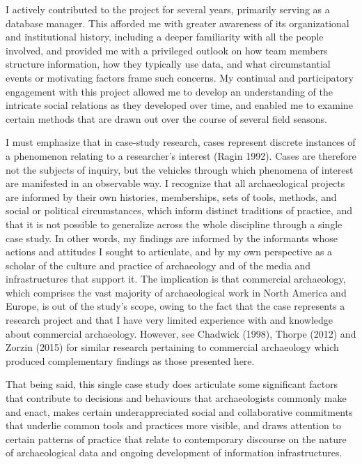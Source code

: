 \documentclass[
]{article}
\begin{document}
I actively contributed to the project for several years, primarily
serving as a database manager. This afforded me with greater awareness
of its organizational and institutional history, including a deeper
familiarity with all the people involved, and provided me with a
privileged outlook on how team members structure information, how they
typically use data, and what circumstantial events or motivating factors
frame such concerns. My continual and participatory engagement with this
project allowed me to develop an understanding of the intricate social
relations as they developed over time, and enabled me to examine certain
methods that are drawn out over the course of several field seasons.

I must emphasize that in case-study research, cases represent discrete
instances of a phenomenon relating to a researcher's interest (Ragin
1992). Cases are therefore not the subjects of inquiry, but the vehicles
through which phenomena of interest are manifested in an observable way.
I recognize that all archaeological projects are informed by their own
histories, memberships, sets of tools, methods, and social or political
circumstances, which inform distinct traditions of practice, and that it
is not possible to generalize across the whole discipline through a
single case study. In other words, my findings are informed by the
informants whose actions and attitudes I sought to articulate, and by my
own perspective as a scholar of the culture and practice of archaeology
and of the media and infrastructures that support it. The implication is
that commercial archaeology, which comprises the vast majority of
archaeological work in North America and Europe, is out of the study's
scope, owing to the fact that the case represents a research project and
that I have very limited experience with and knowledge about commercial
archaeology. However, see Chadwick (1998), Thorpe (2012) and Zorzin
(2015) for similar research pertaining to commercial archaeology which
produced complementary findings as those presented here.

That being said, this single case study does articulate some significant
factors that contribute to decisions and behaviours that archaeologists
commonly make and enact, makes certain underappreciated social and
collaborative commitments that underlie common tools and practices more
visible, and draws attention to certain patterns of practice that relate
to contemporary discourse on the nature of archaeological data and
ongoing development of information infrastructures.
\end{document}

